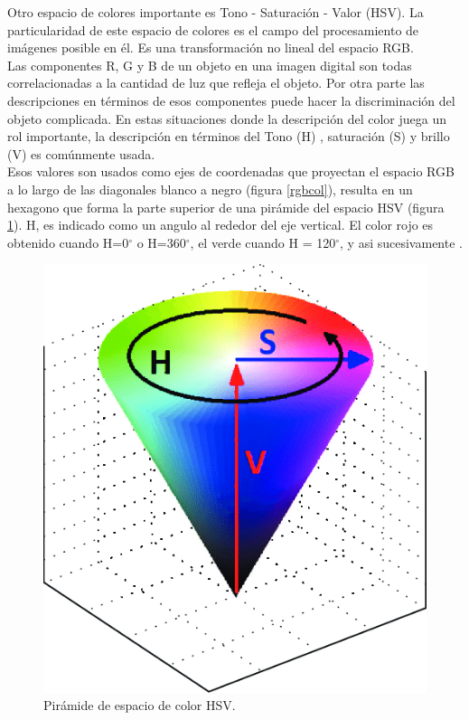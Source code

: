 \documentclass[twoside,spanish,ESP,MSc]{plantillaLabUPV}
\theoremstyle{definition}
\begin{document}
Otro espacio de colores importante es Tono - Saturación - Valor (HSV). La particularidad de este espacio de colores es el campo del procesamiento de imágenes posible en él. Es una transformación no lineal del espacio RGB.\\

Las componentes R, G y B de un objeto en una imagen digital son todas correlacionadas a la cantidad de luz que refleja el objeto. Por otra parte las descripciones en términos de esos componentes puede hacer la discriminación del objeto complicada. En estas situaciones donde la descripción del color juega un rol importante, la descripción en términos del Tono (H) , saturación (S) y brillo (V) es comúnmente usada.\\

Esos valores son usados como ejes de coordenadas que proyectan el espacio RGB a lo largo de las diagonales blanco a negro (figura \ref{rgbcol}), resulta en un hexagono que forma la parte superior de una pirámide del espacio HSV (figura \ref{hsvcol}). H, es indicado como un angulo al rededor del eje vertical. El color rojo es obtenido cuando H=0$^{\circ}$ o H=360$^{\circ}$, el verde cuando H = 120$^{\circ}$, y asi sucesivamente \cite{Koschan:2008:DCI:1370941}.

\begin{figure}[h] 
	\centering 
		\includegraphics[scale=.35]{ima/hsvcol} 
	\caption{Pirámide de espacio de color HSV.} 
	\label{hsvcol} 
\end{figure}
\end{document}
